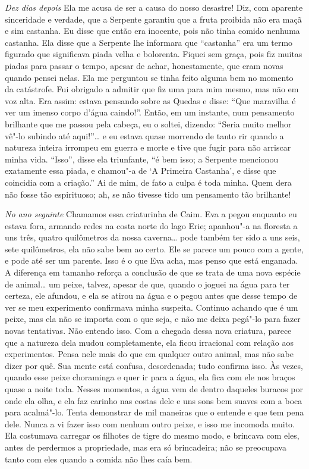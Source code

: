 \textit{Dez dias depois}  Ela me acusa de ser a causa do nosso desastre! Diz, com
aparente sinceridade e verdade, que a Serpente garantiu que a fruta
proibida não era maçã e sim castanha. Eu disse que então era inocente, 
pois não tinha comido nenhuma castanha. Ela disse que a Serpente lhe
informara que “castanha” era um termo figurado que significava piada
velha e bolorenta. Fiquei sem graça, pois fiz muitas piadas para passar o
tempo, apesar de achar, honestamente, que eram novas quando pensei nelas. Ela
me perguntou se tinha feito alguma bem no momento da catástrofe. Fui obrigado a
admitir que fiz uma para mim mesmo, mas não em voz alta. Era assim:
estava pensando sobre as Quedas e disse: “Que maravilha é ver um
imenso corpo d'água caindo!”. Então, em um instante, num
pensamento brilhante que me passou pela cabeça, eu o soltei, dizendo: “Seria
muito melhor vê"-lo subindo até aqui!”\ldots{} e eu estava quase morrendo de tanto rir
quando a natureza inteira irrompeu em guerra e morte e tive que fugir para
não arriscar minha vida. ``Isso”, disse ela triunfante, “é bem isso; a Serpente
mencionou exatamente essa piada, e chamou"-a de `A Primeira Castanha', e disse que
coincidia com a criação.'' Ai de mim, de fato a culpa é toda minha. Quem dera não
fosse tão espirituoso; ah, se não tivesse tido um pensamento tão brilhante!

\textit{No ano seguinte}  Chamamos essa criaturinha de Caim. Eva a pegou enquanto eu estava
fora, armando redes na costa norte do lago Erie; apanhou"-a na floresta a uns
três, quatro quilômetros da nossa caverna\ldots{} pode também ter sido a uns seis, sete
quilômetros, ela não sabe bem ao certo. Ele se parece um pouco com a gente, e
pode até ser um parente. Isso é o que Eva acha, mas penso que está enganada. A
diferença em tamanho reforça a conclusão de que se trata de uma nova espécie de
animal\ldots{} um peixe, talvez, apesar de que, quando o joguei na água para ter
certeza, ele afundou, e ela se atirou na água e o pegou antes que desse tempo
de ver se meu experimento confirmava minha suspeita. Continuo achando
que é um peixe, mas ela não se importa com o que seja, e não me deixa pegá"-lo
para fazer novas tentativas. Não entendo isso. Com a chegada dessa nova
criatura, parece que a natureza dela mudou completamente, ela ficou irracional
com relação aos experimentos. Pensa nele mais do que em qualquer outro
animal, mas não sabe dizer por quê. Sua mente está confusa, desordenada; tudo
confirma isso. Às vezes, quando esse peixe choraminga e quer ir para a água,
ela fica com ele nos braços quase a noite toda. Nesses momentos, a água vem
de dentro daqueles buracos por onde ela olha, e ela faz carinho nas
costas dele e uns sons bem suaves com a boca para acalmá"-lo. Tenta
demonstrar de mil maneiras que o entende e que tem pena dele. Nunca a vi
fazer isso com nenhum outro peixe, e isso me incomoda muito. Ela
costumava carregar os filhotes de tigre do mesmo modo, e brincava com eles,
antes de perdermos a propriedade, mas era só brincadeira; não se preocupava
tanto com eles quando a comida não lhes caía bem. 

